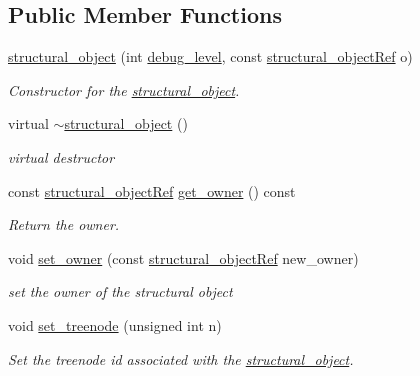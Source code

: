 \subsection*{Public Member Functions}
\begin{DoxyCompactItemize}
\item 
\hyperlink{classstructural__object_a28c605699d1923f66549bd42a62d6046}{structural\+\_\+object} (int \hyperlink{classstructural__object_ac2744292aa7f0fca3742133d16bb3201}{debug\+\_\+level}, const \hyperlink{structural__objects_8hpp_a8ea5f8cc50ab8f4c31e2751074ff60b2}{structural\+\_\+object\+Ref} o)
\begin{DoxyCompactList}\small\item\em Constructor for the \hyperlink{classstructural__object}{structural\+\_\+object}. \end{DoxyCompactList}\item 
virtual \hyperlink{classstructural__object_ae602f3bc90a576ff01ac7c1811e2c6c0}{$\sim$structural\+\_\+object} ()
\begin{DoxyCompactList}\small\item\em virtual destructor \end{DoxyCompactList}\item 
const \hyperlink{structural__objects_8hpp_a8ea5f8cc50ab8f4c31e2751074ff60b2}{structural\+\_\+object\+Ref} \hyperlink{classstructural__object_a0a86ebdcc46ff4f74712a0d755bcad9d}{get\+\_\+owner} () const
\begin{DoxyCompactList}\small\item\em Return the owner. \end{DoxyCompactList}\item 
void \hyperlink{classstructural__object_a6baefd335d65ccf273b2bf3cf660cd90}{set\+\_\+owner} (const \hyperlink{structural__objects_8hpp_a8ea5f8cc50ab8f4c31e2751074ff60b2}{structural\+\_\+object\+Ref} new\+\_\+owner)
\begin{DoxyCompactList}\small\item\em set the owner of the structural object \end{DoxyCompactList}\item 
void \hyperlink{classstructural__object_a93d2151908044a34a703473b254a2fc5}{set\+\_\+treenode} (unsigned int n)
\begin{DoxyCompactList}\small\item\em Set the treenode id associated with the \hyperlink{classstructural__object}{structural\+\_\+object}. \end{DoxyCompactList}\item 

\end{DoxyCompactItemize}
